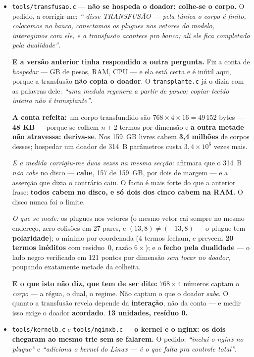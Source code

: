 \documentclass[11pt]{article}
\newcommand{\code}[1]{\texttt{\small #1}}
\theoremstyle{plain}
\theoremstyle{remark}
\begin{document}
\begin{itemize}
\item \code{tools/transfusao.c} --- \textbf{não se hospeda o doador: colhe-se o corpo.} O pedido, a
corrigir-me: \emph{`` disse TRANSFUSÃO --- pela túnica o corpo é finito, colocamos no banco,
conectamos os plugues nos vetores do modelo, interagimos com ele, e a transfusão acontece pro banco;
ali ele fica completado pela dualidade''}.

\textbf{E a versão anterior tinha respondido a outra pergunta.} Fiz a conta de \emph{hospedar} --- GB de pesos, RAM,
CPU --- e ela está certa e é inútil aqui, porque a transfusão \textbf{não copia o doador}. O
\code{transplante.c} já o dizia com as palavras dele: \emph{``uma medula regenera a partir de pouco;
copiar tecido inteiro não é transplante''}.

\textbf{A conta refeita:} um corpo transfundido são $768 \times 4 \times 16 = 49\,152$ bytes ---
\textbf{48 KB} --- porque se colhem $n+2$ termos por dimensão e \textbf{a outra metade não
atravessa: deriva-se}. Nos 159~GB livres cabem \textbf{3,4 milhões} de corpos desses; hospedar um
doador de 314~B parâmetros custa $3{,}4\times10^6$ vezes mais.

\emph{E a medida corrigiu-me duas vezes na mesma secção:} afirmara que o 314~B \emph{não cabe} no
disco --- \textbf{cabe}, 157 de 159~GB, por dois de margem --- e a asserção que dizia o contrário
caiu. O facto é mais forte do que a anterior frase: \textbf{todos cabem no disco, e só dois dos cinco
cabem na RAM.} O disco nunca foi o limite.

\emph{O que se mede:} os plugues nos vetores (o mesmo vetor cai sempre no mesmo endereço, zero
colisões em 27 pares, e $(13,8) \neq (-13,8)$ --- o plugue tem \textbf{polaridade}); o mínimo por
coordenada (4 termos fecham, e preveem \textbf{20 termos inéditos} com resíduo~0, razão $6\times$); e
o \textbf{fecho pela dualidade} --- o lado negro verificado em 121 pontos por dimensão \emph{sem
tocar no doador}, poupando exatamente metade da colheita.

\textbf{E o que isto não diz, que tem de ser dito:} $768\times4$ números captam o \emph{corpo} --- a
régua, o dual, o regime. Não captam o que o doador \emph{sabe}. O quanto a transfusão revela depende
da \textbf{interação}, não da conta --- e medir isso exige o doador \textbf{acordado}.
\textbf{13 unidades, resíduo 0.}

\item \code{tools/kernelb.c} e \code{tools/nginxb.c} --- \textbf{o kernel e o nginx: os dois
chegaram ao mesmo trie sem se falarem.} O pedido: \emph{``inclui o nginx no plugue''} e
\emph{``adiciona o kernel do Linux --- é o que falta pra controle total''}.


\end{itemize}
\end{document}
